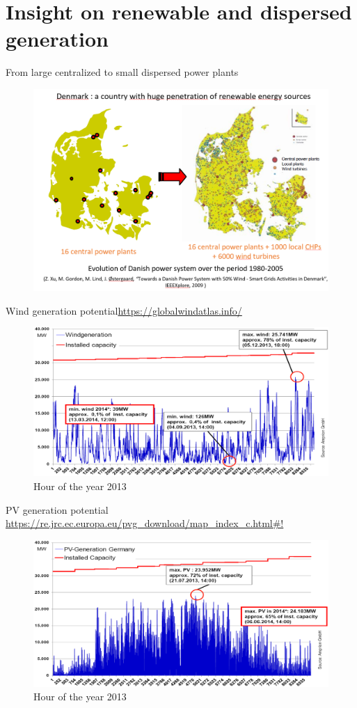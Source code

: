 \section{Insight on renewable and dispersed generation}

\begin{frame}
{From large centralized to small dispersed power plants}
\begin{figure}
\centering
\includegraphics[width=0.6\linewidth]{images/danemark_RES.png}
\end{figure}
\end{frame}

\begin{frame}
{Wind generation potential}\url{https://globalwindatlas.info/}
\begin{figure}
\centering
\includegraphics[width=0.6\linewidth]{images/wind_gen_DE.png}
\caption*{Hour of the year 2013}
\end{figure}
\end{frame}

\begin{frame}{PV generation potential}
\url{https://re.jrc.ec.europa.eu/pvg_download/map_index_c.html#!}
\begin{figure}
\centering
\includegraphics[width=0.7\linewidth]{images/PV_gen_DE.png}
\caption*{Hour of the year 2013}
\end{figure}
\end{frame}

